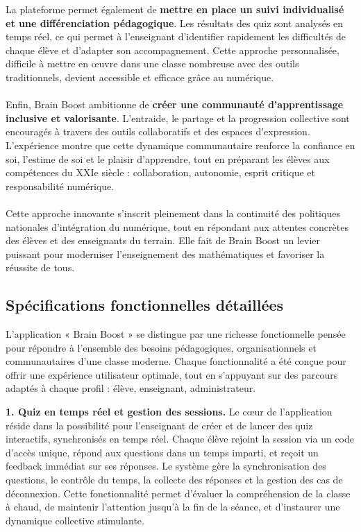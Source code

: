 \documentclass[a4paper,11pt]{report}
\begin{document}
La plateforme permet également de \textbf{mettre en place un suivi individualisé et une différenciation pédagogique}. Les résultats des quiz sont analysés en temps réel, ce qui permet à l'enseignant d'identifier rapidement les difficultés de chaque élève et d'adapter son accompagnement. Cette approche personnalisée, difficile à mettre en œuvre dans une classe nombreuse avec des outils traditionnels, devient accessible et efficace grâce au numérique.\\ \\
Enfin, Brain Boost ambitionne de \textbf{créer une communauté d'apprentissage inclusive et valorisante}. L'entraide, le partage et la progression collective sont encouragés à travers des outils collaboratifs et des espaces d'expression. L'expérience montre que cette dynamique communautaire renforce la confiance en soi, l'estime de soi et le plaisir d'apprendre, tout en préparant les élèves aux compétences du XXIe siècle : collaboration, autonomie, esprit critique et responsabilité numérique.\\ \\
Cette approche innovante s'inscrit pleinement dans la continuité des politiques nationales d'intégration du numérique, tout en répondant aux attentes concrètes des élèves et des enseignants du terrain. Elle fait de Brain Boost un levier puissant pour moderniser l'enseignement des mathématiques et favoriser la réussite de tous.

\subsection{Spécifications fonctionnelles détaillées}
L'application « Brain Boost » se distingue par une richesse fonctionnelle pensée pour répondre à l'ensemble des besoins pédagogiques, organisationnels et communautaires d'une classe moderne. Chaque fonctionnalité a été conçue pour offrir une expérience utilisateur optimale, tout en s'appuyant sur des parcours adaptés à chaque profil : élève, enseignant, administrateur.

\textbf{1. Quiz en temps réel et gestion des sessions.} Le cœur de l'application réside dans la possibilité pour l'enseignant de créer et de lancer des quiz interactifs, synchronisés en temps réel. Chaque élève rejoint la session via un code d'accès unique, répond aux questions dans un temps imparti, et reçoit un feedback immédiat sur ses réponses. Le système gère la synchronisation des questions, le contrôle du temps, la collecte des réponses et la gestion des cas de déconnexion. Cette fonctionnalité permet d'évaluer la compréhension de la classe à chaud, de maintenir l'attention jusqu'à la fin de la séance, et d'instaurer une dynamique collective stimulante.
\end{document}
